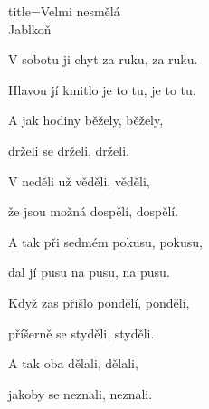 \begin{song}{title=\centering Velmi nesmělá \\\normalsize Jablkoň  \vspace*{-0.3cm}}
{\begin{minipage}[t]{0.48\textwidth}
\sloka
	V sobotu ji chyt za ruku, za ruku.
	
	Hlavou jí kmitlo je to tu, je to tu.
	
	A jak hodiny běžely, běžely,
	
	drželi se drželi, drželi.

\end{minipage}\begin{minipage}[t]{0.48\textwidth}\setlength{\parindent}{0.45cm}\vspace*{0.55cm}  %

	
\sloka
	V neděli už věděli, věděli,

	že jsou možná dospělí, dospělí.
	
	A tak při sedmém pokusu, pokusu,
	
	dal jí pusu na pusu, na pusu.


\sloka
	Když zas přišlo pondělí, pondělí,
	
	příšerně se styděli, styděli.
	
	A tak oba dělali, dělali,
	
	jakoby se neznali, neznali.

\phantom{.}

\phantom{.}





\end{minipage}
}
\setcounter{Slokočet}{0}
\end{song}


